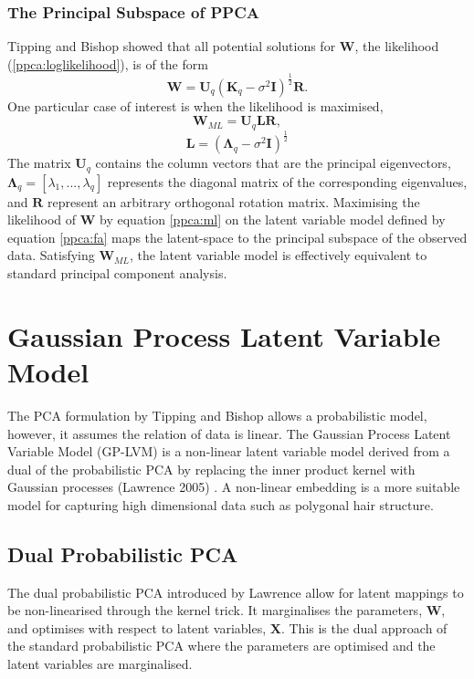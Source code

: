 \documentclass[ %
author={Dillon Keith Diep},
supervisor={Dr. Carl Henrik Ek},
degree={MEng},
title={ART-CG Hair:},
subtitle={Assisted Real-time Content Generation of Stylised Virtual Hair},
type={Research},
year={2017} ]{dissertation}
\begin{document}
\subsubsection{The Principal Subspace of PPCA}
Tipping and Bishop showed that all potential solutions for $\bm{W}$, the likelihood (\ref{ppca:loglikelihood}), is of the form \cite{ppca} $$\bm{W}=\bm{U}_q(\bm{K}_q-\sigma^2\bm{I})^\frac{1}{2}\bm{R}.$$
One particular case of interest is when the likelihood is maximised,
\begin{equation} \label{ppca:ml}
\bm{W}_{ML}=\bm{U}_q\bm{LR},
\end{equation}
$$\bm{L}=(\bm{\Lambda}_q-\sigma^2\bm{I})^{\frac{1}{2}}$$
The matrix $\bm{U}_q$ contains the column vectors that are the principal eigenvectors, $\bm{\Lambda}_q=[\lambda_1,...,\lambda_q]$ represents the diagonal matrix of the corresponding eigenvalues, and $\bm{R}$ represent an arbitrary orthogonal rotation matrix. 
Maximising the likelihood of $\bm{W}$ by equation \ref{ppca:ml} on the latent variable model defined by equation \ref{ppca:fa} maps the latent-space to the principal subspace of the observed data. Satisfying $\bm{W}_{ML}$, the latent variable model is effectively equivalent to standard principal component analysis.

\section{Gaussian Process Latent Variable Model}
The PCA formulation by Tipping and Bishop allows a probabilistic model, however, it assumes the relation of data is linear. The Gaussian Process Latent Variable Model (GP-LVM) is a non-linear latent variable model derived from a dual of the probabilistic PCA by replacing the inner product kernel with Gaussian processes (Lawrence 2005) \cite{gplvm}. A non-linear embedding is a more suitable model for capturing high dimensional data such as polygonal hair structure.
	
\subsection{Dual Probabilistic PCA}
The dual probabilistic PCA introduced by Lawrence allow for latent mappings to be non-linearised through the kernel trick. It marginalises the parameters, $\bm{W}$, and optimises with respect to latent variables, $\bm{X}$. This is the dual approach of the standard probabilistic PCA where the parameters are optimised and the latent variables are marginalised.
\end{document}
